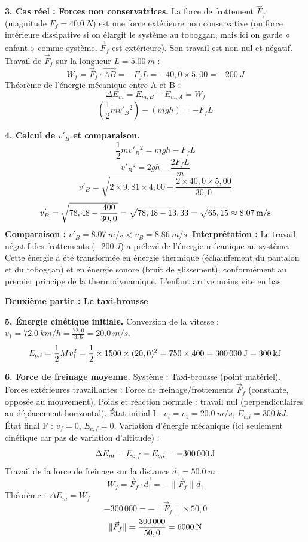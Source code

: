 \documentclass[11pt]{article}
\begin{document}
\begin{exoresolu}
\noindent \textbf{3. Cas réel : Forces non conservatrices.}
La force de frottement $\vec{F}_f$ (magnitude $F_f = \SI{40,0}{N}$) est une force extérieure non conservative (ou force intérieure dissipative si on élargit le système au toboggan, mais ici on garde « enfant » comme système, $\vec{F}_f$ est extérieure). Son travail est non nul et négatif.
Travail de $\vec{F}_f$ sur la longueur $L = \SI{5,00}{m}$ :
\[ W_f = \vec{F}_f \cdot \vec{AB} = - F_f L = -40,0 \times 5,00 = \SI{-200}{J} \]
Théorème de l'énergie mécanique entre A et B :
\[ \Delta E_m = E_{m,B} - E_{m,A} = W_f \]
\[ \left( \frac{1}{2} m v'_B{}^2 \right) - (m g h) = - F_f L \]

\noindent \textbf{4. Calcul de $v'_B$ et comparaison.}
\[ \frac{1}{2} m v'_B{}^2 = m g h - F_f L \]
\[ v'_B{}^2 = 2 g h - \frac{2 F_f L}{m} \]
\[ v'_B = \sqrt{ 2 \times 9,81 \times 4,00 - \frac{2 \times 40,0 \times 5,00}{30,0} } \]
\[ v'_B = \sqrt{ 78,48 - \frac{400}{30,0} } = \sqrt{ 78,48 - 13,33 } = \sqrt{ 65,15 } \approx \textbf{\SI{8,07}{m/s}} \]
\textbf{Comparaison :} $v'_B = \SI{8,07}{m/s} < v_B = \SI{8,86}{m/s}$.
\textbf{Interprétation :} Le travail négatif des frottements ($\SI{-200}{J}$) a prélevé de l'énergie mécanique au système. Cette énergie a été transformée en énergie thermique (échauffement du pantalon et du toboggan) et en énergie sonore (bruit de glissement), conformément au premier principe de la thermodynamique. L'enfant arrive moins vite en bas.

\vspace{0.5cm}
\noindent \textbf{Deuxième partie : Le taxi-brousse}

\noindent \textbf{5. Énergie cinétique initiale.}
Conversion de la vitesse : $v_1 = \SI{72,0}{km/h} = \frac{72,0}{3,6} = \SI{20,0}{m/s}$.
\[ E_{c,i} = \frac{1}{2} M v_1^2 = \frac{1}{2} \times 1500 \times (20,0)^2 = 750 \times 400 = \textbf{\SI{300\,000}{J}} = \textbf{\SI{300}{kJ}} \]

\noindent \textbf{6. Force de freinage moyenne.}
Système : Taxi-brousse (point matériel). Forces extérieures travaillantes : Force de freinage/frottements $\vec{F}_f$ (constante, opposée au mouvement). Poids et réaction normale : travail nul (perpendiculaires au déplacement horizontal).
État initial I : $v_i = v_1 = \SI{20,0}{m/s}$, $E_{c,i} = \SI{300}{kJ}$.
État final F : $v_f = 0$, $E_{c,f} = 0$.
Variation d'énergie mécanique (ici seulement cinétique car pas de variation d'altitude) :
\[ \Delta E_m = E_{c,f} - E_{c,i} = -\SI{300\,000}{J} \]
Travail de la force de freinage sur la distance $d_1 = \SI{50,0}{m}$ :
\[ W_f = \vec{F}_f \cdot \vec{d_1} = - \|\vec{F}_f\| d_1 \]
Théorème : $\Delta E_m = W_f$
\[ -300\,000 = - \|\vec{F}_f\| \times 50,0 \]
\[ \|\vec{F}_f\| = \frac{300\,000}{50,0} = \textbf{\SI{6\,000}{N}} \]


\end{exoresolu}
\end{document}
